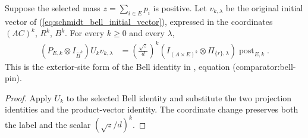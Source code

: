 \begin{theorem}
    \label{thm:schmidt_bell_site_pin}
    \leanok
    Suppose the selected mass $z=\sum_{i\in E}p_i$ is positive.
    Let $v_{k,\lambda}$ be the original initial vector of
    (\ref{eq:schmidt_bell_initial_vector}), expressed in the coordinates
    $(AC)^k$, $R^k$, $B^k$. For every $k\ge0$ and every $\lambda$,
    \begin{align*}
        (P_{E,k}\otimes I_{\widehat B^k})U_kv_{k,\lambda}
        &=\left(\frac{\sqrt z}{d}\right)^k
        (I_{(A\times E)^k}\otimes\Pi_{\{r\},\lambda})
        \operatorname{post}_{E,k}.
    \end{align*}
    This is the exterior-site form of the Bell identity in
    \cite[Section~8]{OpenAI2026AreaLaw}, equation
    \textup{(comparator:bell-pin)}.
\end{theorem}
\begin{proof}
    \leanok
    Apply $U_k$ to the selected Bell identity and substitute the two
    projection identities and the product-vector identity. The coordinate
    change preserves both the label and the scalar $(\sqrt z/d)^k$.
\end{proof}

